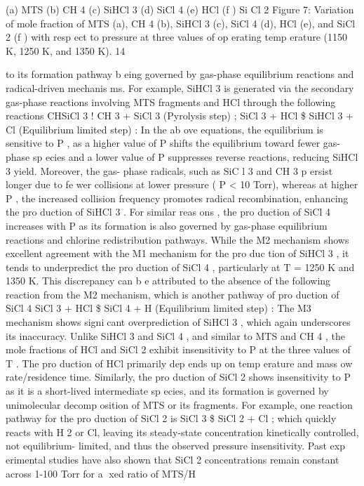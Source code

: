 \documentclass[10pt, letterpaper]{article}
\begin{document}
(a) MTS
(b) CH
4
(c) SiHCl
3
(d) SiCl
4
(e) HCl
(f ) Si Cl
2
Figure 7: Variation of mole fraction of MTS (a), CH
4
(b), SiHCl
3
(c), SiCl
4
(d), HCl (e), and SiCl
2
(f ) with resp ect to pressure
at three values of op erating temp erature (1150 K, 1250 K, and 1350 K).
14


to its formation pathway b eing governed by gas-phase equilibrium reactions and radical-driven mechanis ms.
For example, SiHCl
3
is generated via the secondary gas-phase reactions involving MTS fragments and HCl
through the following reactions
CHSiCl
3
!
CH
3
+ SiCl
3
(Pyrolysis step)
;
SiCl
3
+ HCl
\$
SiHCl
3
+ Cl (Equilibrium limited step)
:
In the ab ove equations, the equilibrium is sensitive to
P
, as a higher value of
P
shifts the equilibrium toward
fewer gas-phase sp ecies and a lower value of
P
suppresses reverse reactions, reducing SiHCl
3
yield. Moreover,
the gas- phase radicals, such as SiC l
3
and CH
3
p ersist longer due to fe wer collisions at lower pressure (
P <
10
Torr), whereas at higher
P
, the increased collision frequency promotes radical recombination, enhancing the
pro duction of SiHCl
3
. For similar reas ons , the pro duction of SiCl
4
increases with
P
as its formation is also
governed by gas-phase equilibrium reactions and chlorine redistribution pathways. While the M2 mechanism
shows excellent agreement with the M1 mechanism for the pro duc tion of SiHCl
3
, it tends to underpredict
the pro duction of SiCl
4
, particularly at
T
= 1250 K and 1350 K. This discrepancy can b e attributed to the
absence of the following reaction from the M2 mechanism, which is another pathway of pro duction of SiCl
4
SiCl
3
+ HCl
\$
SiCl
4
+ H (Equilibrium limited step)
:
The M3 mechanism shows signicant overprediction of SiHCl
3
, which again underscores its inaccuracy.
Unlike SiHCl
3
and SiCl
4
, and similar to MTS and CH
4
, the mole fractions of HCl and SiCl
2
exhibit
insensitivity to
P
at the three values of
T
. The pro duction of HCl primarily dep ends up on temp erature
and mass 
ow rate/residence time. Similarly, the pro duction of SiCl
2
shows insensitivity to
P
as it is a
short-lived intermediate sp ecies, and its formation is governed by unimolecular decomp osition of MTS or its
fragments. For example, one reaction pathway for the pro duction of SiCl
2
is
SiCl
3
\$
SiCl
2
+ Cl
;
which quickly reacts with H
2
or Cl, leaving its steady-state concentration kinetically controlled, not equilibrium-
limited, and thus the observed pressure insensitivity. Past exp erimental studies have also shown that SiCl
2
concentrations remain constant across 1-100 Torr for a xed ratio of MTS/H
\end{document}
